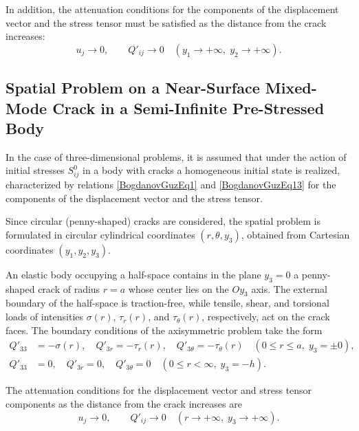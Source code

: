 In addition, the attenuation conditions for the components of the displacement vector and the stress tensor must be satisfied as the distance from the crack increases:
\begin{equation}
	\label{BogdanovGuzEq20}
	u_j \to 0, \qquad Q'_{ij} \to 0
	\quad (y_{1} \to +\infty,\; y_{2} \to +\infty).
\end{equation}

\subsection{Spatial Problem on a Near-Surface Mixed-Mode Crack in a Semi-Infinite Pre-Stressed Body}

In the case of three-dimensional problems, it is assumed that under the action of initial stresses $S_{ij}^{0}$ in a body with cracks a homogeneous initial state is realized, characterized by relations \eqref{BogdanovGuzEq1} and \eqref{BogdanovGuzEq13} for the components of the displacement vector and the stress tensor. 

Since circular (penny-shaped) cracks are considered, the spatial problem is formulated in circular cylindrical coordinates $(r,\theta,y_{3})$, obtained from Cartesian coordinates $(y_{1},y_{2},y_{3})$.

An elastic body occupying a half-space contains in the plane $y_{3}=0$ a penny-shaped crack of radius $r=a$ whose center lies on the $Oy_{3}$ axis. The external boundary of the half-space is traction-free, while tensile, shear, and torsional loads of intensities $\sigma(r)$, $\tau_r(r)$, and $\tau_{\theta}(r)$, respectively, act on the crack faces. The boundary conditions of the axisymmetric problem take the form
\begin{align}
	\nonumber
	Q'_{33} &= -\sigma(r), \quad 
	Q'_{3r} = -\tau_r(r), \quad 
	Q'_{3\theta} = -\tau_{\theta}(r)
	\quad (0 \le r \le a,\; y_{3} = \pm 0),\\
	\label{BogdanovGuzEq21}
	Q'_{33} &= 0, \quad 
	Q'_{3r} = 0, \quad 
	Q'_{3\theta} = 0
	\quad (0 \le r < \infty,\; y_{3} = -h).
\end{align}

The attenuation conditions for the displacement vector and stress tensor components as the distance from the crack increases are
\begin{equation}
	\label{BogdanovGuzEq22}
	u_j \to 0, \qquad Q'_{ij} \to 0
	\quad (r \to +\infty,\; y_{3} \to +\infty).
\end{equation}

